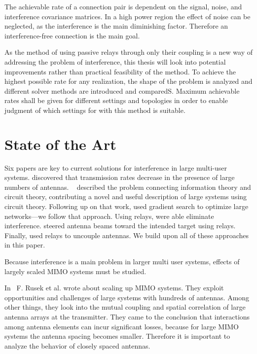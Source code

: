 The achievable rate of a connection pair is dependent on the signal, noise, and interference covariance matrices.
In a high power region the effect of noise can be neglected, as the interference is the main diminishing factor.
Therefore an interference-free connection is the main goal.

As the method of using passive relays through only their coupling is a new way of addressing the problem of interference, this thesis will look into potential improvements rather than practical feasibility of the method.
To achieve the highest possible rate for any realization, the shape of the problem is analyzed and different solver methods are introduced and comparedS.
Maximum achievable rates shall be given for different settings and topologies in order to enable judgment of which settings for with this method is suitable.

\section{State of the Art}
\label{sec:SoA}

Six papers are key to current solutions for interference in large multi-user systems.
\cite{rusek13} discovered that transmission rates decrease in the presence of large numbers of antennas.
~\cite{Nossek} described the problem connecting information theory and circuit theory, contributing a novel and useful description of large systems using circuit theory.
Following up on that work, \cite{Yahia2013} used gradient search to optimize large networks---we follow that approach.
Using relays, \cite{Berger05} were able eliminate interference.
\cite{Bains08} steered antenna beams toward the intended target using relays.
Finally, \cite{Lau12} used relays to uncouple antennas.
We build upon all of these approaches in this paper.

Because interference is a main problem in larger multi user systems, effects of largely scaled MIMO systems must be studied.

In~\cite{rusek13} F. Rusek et al. wrote about scaling up MIMO systems.
They exploit opportunities and challenges of large systems with hundreds of antennas.
Among other things, they look into the mutual coupling and spatial correlation of large antenna arrays at the transmitter.
They came to the conclusion that interactions among antenna elements can incur significant losses, because for large MIMO systems the antenna spacing becomes smaller.
Therefore it is important to analyze the behavior of closely spaced antennas.

